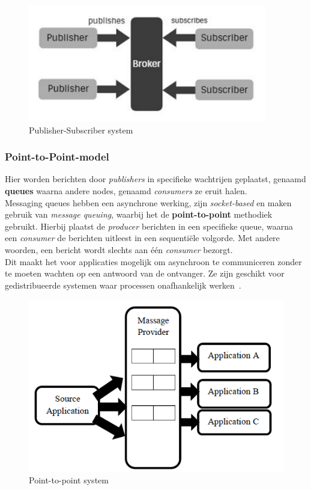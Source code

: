 \begin{figure}[h!]
  \centering
  \includegraphics[width=.4\textwidth]{../voorstel/img/fig1-publish-subscribe.png}
  \caption{\label{fig:pub-sub}Publisher-Subscriber system~\autocite{Sharvari2019}}
\end{figure}

\subsubsection{Point-to-Point-model}
Hier worden berichten door \emph{publishers} in specifieke wachtrijen geplaatst, 
genaamd \textbf{queues} waarna andere nodes, genaamd \emph{consumers} ze eruit halen. 
\\
Messaging queues hebben een asynchrone werking, zijn \emph{socket-based} en maken gebruik van \emph{message queuing}, 
waarbij het de \textbf{point-to-point} methodiek gebruikt.
Hierbij plaatst de \emph{producer} berichten in een specifieke queue, waarna een \emph{consumer} de berichten uitleest in een sequentiële volgorde.
Met andere woorden, een bericht wordt slechts aan één \emph{consumer} bezorgt.
\\
Dit maakt het voor applicaties mogelijk om asynchroon te communiceren zonder te moeten wachten op een antwoord van de ontvanger.
Ze zijn geschikt voor gedistribueerde systemen waar processen onafhankelijk werken~\autocite{Dinari2020}.

\begin{figure}[h!]
  \centering
  \includegraphics[width=.4\textwidth]{../bachproef/img/point-to-point-messaging.png}
  \caption{\label{fig:point-to-point}Point-to-point system~\autocite{Dinari2020}}
\end{figure}


